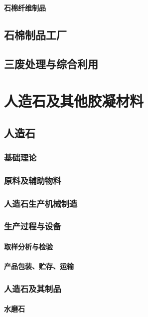 \documentclass[UTF8]{../../ApplicationUniverse}
\begin{document}
        \subsubsection{石棉纤维制品}
\section{石棉制品工厂}
\section{三废处理与综合利用}






\chapter{人造石及其他胶凝材料}
\section{人造石}
    \subsection{基础理论}
    \subsection{原料及辅助物料}
    \subsection{人造石生产机械制造}
    \subsection{生产过程与设备}
        \subsubsection{取样分析与检验}
        \subsubsection{产品包装、贮存、运输}
    \subsection{人造石及其制品}
        \subsubsection{水磨石}
\end{document}
